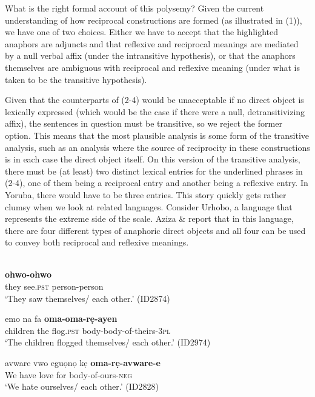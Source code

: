 \documentclass[output=paper]{langsci/langscibook}
\begin{document}
  What is the right formal account of this polysemy? Given the current understanding of how reciprocal constructions are formed (as illustrated in (1)), we have one of two choices. Either we have to accept that the highlighted anaphors are adjuncts and that reflexive and reciprocal meanings are mediated by a null verbal affix (under the intransitive hypothesis), or that the anaphors themselves are ambiguous with reciprocal and reflexive meaning (under what is taken to be the transitive hypothesis). 

  Given that the counterparts of (2-4) would be unacceptable if no direct object is lexically expressed (which would be the case if there were a null, detransitivizing affix), the sentences in question must be transitive, so we reject the former option. This means that the most plausible analysis is some form of the transitive analysis, such as an analysis where the source of reciprocity in these constructions is in each case the direct object itself. On this version of the transitive analysis, there must be (at least) two distinct lexical entries for the underlined phrases in (2-4), one of them being a reciprocal entry and another being a reflexive entry. In Yoruba, there would have to be three entries. This story quickly gets rather clumsy when we look at related languages. Consider Urhobo, a language that represents the extreme side of the scale. Aziza \& \citet{Safir2006} report that in this language, there are four different types of anaphoric direct objects and all four can be used to convey both reciprocal and reflexive meanings. 


\ea\label{ex:}
 \\
\ea\label{ex:}
     \textbf{{ohwo-ohwo}} \\
       they   see.\textsc{pst}   person-person \\
\glt   ‘They saw themselves/ each other.’ (ID2874)

\ex
\gll emo    na  fa    \textbf{{oma-oma-rẹ-ayen}}\\
 children  the  flog.\textsc{pst}  body-body-of-theirs-\textsc{3pl}\\
\glt   ‘The children flogged themselves/ each other.’ (ID2974)

\ex
\glt avware   vwo  eguọnọ   kẹ   \textbf{oma-rẹ-avware-e}\\
       We     have   love     for   body-of-ours-\textsc{neg}  \\
\glt   ‘We hate ourselves/ each other.’  (ID2828)
\end{document}
